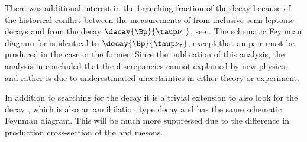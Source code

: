 There was additional interest in the branching fraction of the decay \btodsphi because of the
historical conflict between the measurements of  from inclusive semi-leptonic decays and
from the decay $\decay{\Bp}{\taup\nu_\tau}$, see .
The schematic Feynman diagram for \btodsphi is identical to $\decay{\Bp}{\taup\nu_\tau}$, except
that an \ssbar pair must be produced in the case of the former.
Since the publication of this analysis, the analysis in  concluded that the
discrepancies cannot explained by new physics, and rather is due to underestimated uncertainties in
either theory or experiment.

In addition to searching for the decay \btodsphi it is a trivial extension to also look for the
decay \bctodsphi, which is also an annihilation type decay and has the same schematic Feynman
diagram.
This will be much more suppressed due to the difference in production cross-section of the \Bp and
\Bc mesons.



































